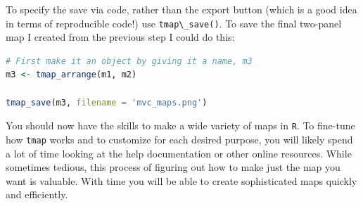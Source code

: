 \documentclass[
]{book}
\newcommand{\passthrough}[1]{#1}
\begin{document}
To specify the save via code, rather than the export button (which is a good idea in terms of reproducible code!) use \passthrough{\lstinline!tmap\_save()!}. To save the final two-panel map I created from the previous step I could do this:

\begin{lstlisting}[language=R]
# First make it an object by giving it a name, m3
m3 <- tmap_arrange(m1, m2)

tmap_save(m3, filename = 'mvc_maps.png')
\end{lstlisting}

You should now have the skills to make a wide variety of maps in \passthrough{\lstinline!R!}. To fine-tune how \passthrough{\lstinline!tmap!} works and to customize for each desired purpose, you will likely spend a lot of time looking at the help documentation or other online resources. While sometimes tedious, this process of figuring out how to make just the map you want is valuable. With time you will be able to create sophisticated maps quickly and efficiently.

  
\end{document}

